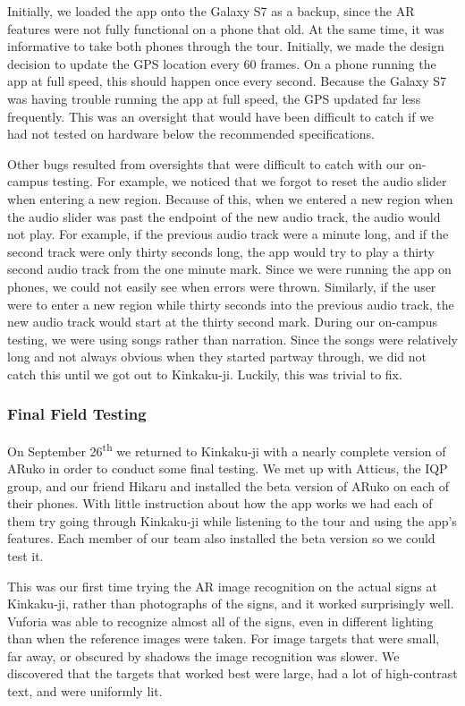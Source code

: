 \documentclass[a4paper, 10pt, american, titlepage]{article}
\begin{document}
Initially, we loaded the app onto the Galaxy S7 as a backup, since the AR
features were not fully functional on a phone that old. At the same time, it was
informative to take both phones through the tour. Initially, we made the design
decision to update the GPS location every 60 frames. On a phone running the app
at full speed, this should happen once every second. Because the Galaxy S7 was
having trouble running the app at full speed, the GPS updated far less
frequently. This was an oversight that would have been difficult to catch if we
had not tested on hardware below the recommended specifications.

Other bugs resulted from oversights that were difficult to catch with our
on-campus testing. For example, we noticed that we forgot to reset the audio
slider when entering a new region.  Because of this, when we entered a new
region when the audio slider was past the endpoint of the new audio track, the
audio would not play. For example, if the previous audio track were a minute
long, and if the second track were only thirty seconds long, the app would try
to play a thirty second audio track from the one minute mark. Since we were
running the app on phones, we could not easily see when errors were thrown.
Similarly, if the user were to enter a new region while thirty seconds into the
previous audio track, the new audio track would start at the thirty second
mark. During our on-campus testing, we were using songs rather than narration.
Since the songs were relatively long and not always obvious when they started
partway through, we did not catch this until we got out to Kinkaku-ji. Luckily,
this was trivial to fix.

\subsubsection{Final Field Testing}
\label{sec:finalFieldTesting}

On September 26\textsuperscript{th} we returned to Kinkaku-ji with a nearly
complete version of ARuko in order to conduct some final testing. We met up with
Atticus, the IQP group, and our friend Hikaru and installed the beta version of
ARuko on each of their phones. With little instruction about how the app works
we had each of them try going through Kinkaku-ji while listening to the tour and
using the app's features. Each member of our team also installed the beta
version so we could test it. %

This was our first time trying the AR image recognition on the actual signs at
Kinkaku-ji, rather than photographs of the signs, and it worked surprisingly
well. Vuforia was able to recognize almost all of the signs, even in different
lighting than when the reference images were taken. For image targets that were
small, far away, or obscured by shadows the image recognition was slower. We
discovered that the targets that worked best were large, had a lot of
high-contrast text, and were uniformly lit.
\end{document}
